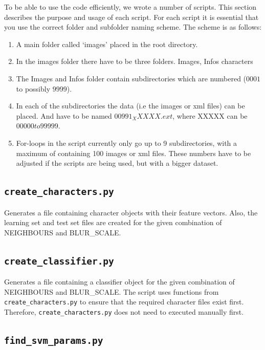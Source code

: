 \documentclass[a4paper]{article}
\begin{document}
To be able to use the code efficiently, we wrote a number of scripts. This
section describes the purpose and usage of each script. For each script it is
essential that you use the correct folder and subfolder naming scheme. The
scheme is as follows:

\begin{enumerate}
    \item A main folder called `images' placed in the root directory.
    \item In the images folder there have to be three folders.  Images, Infos
    characters
    \item The Images and Infos folder contain subdirectories which are numbered
    ($0001$ to possibly $9999$).
    \item In each of the subdirectories the data (i.e the images or xml files)
    can be placed. And have to be named $00991_XXXXX.ext$, where XXXXX can be
    $00000 to 99999$.
    \item For-loops in the script currently only go up to 9 subdirectories,
    with a maximum of containing 100 images or xml files. These numbers have to
    be adjusted if the scripts are being used, but with a bigger dataset.
\end{enumerate}

\subsection*{\texttt{create\_characters.py}}

Generates a file containing character objects with their feature vectors. Also,
the learning set and test set files are created for the given combination of
NEIGHBOURS and BLUR\_SCALE.

\subsection*{\texttt{create\_classifier.py}}

Generates a file containing a classifier object for the given combination of
NEIGHBOURS and BLUR\_SCALE. The script uses functions from
\texttt{create\_characters.py} to ensure that the required character files
exist first. Therefore, \texttt{create\_characters.py} does not need to
executed manually first.

\subsection*{\texttt{find\_svm\_params.py}}
\end{document}
